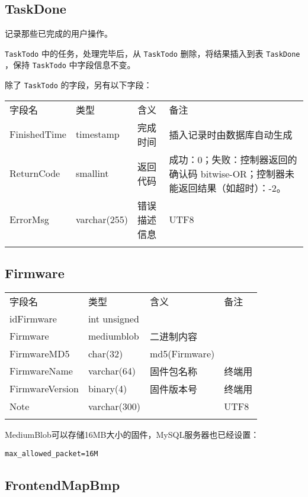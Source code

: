 \subsection{TaskDone}\label{taskdone}

记录那些已完成的用户操作。

\texttt{TaskTodo} 中的任务，处理完毕后，从 \texttt{TaskTodo}
删除，将结果插入到表 \texttt{TaskDone} ，保持 \texttt{TaskTodo}
中字段信息不变。

除了 \texttt{TaskTodo} 的字段，另有以下字段：

\begin{longtabu}[c]{@{}lXXX@{}}
\toprule\addlinespace
字段名 & 类型 & 含义 & 备注
\\\addlinespace
\midrule\endhead
FinishedTime & timestamp & 完成时间 & 插入记录时由数据库自动生成
\\\addlinespace
ReturnCode & smallint & 返回代码 & 成功：0；失败：控制器返回的确认码
bitwise-OR；控制器未能返回结果（如超时）：-2。
\\\addlinespace
ErrorMsg & varchar(255) & 错误描述信息 & UTF8
\\\addlinespace
\bottomrule
\end{longtabu}

\subsection{Firmware}\label{firmware}

\begin{longtabu}[c]{@{}lXXX@{}}
\toprule\addlinespace
字段名 & 类型 & 含义 & 备注
\\\addlinespace
\midrule\endhead
idFirmware & int unsigned & &
\\\addlinespace
Firmware & mediumblob & 二进制内容 &
\\\addlinespace
FirmwareMD5 & char(32) & md5(Firmware) &
\\\addlinespace
FirmwareName & varchar(64) & 固件包名称 & 终端用
\\\addlinespace
FirmwareVersion & binary(4) & 固件版本号 & 终端用
\\\addlinespace
Note & varchar(300) & & UTF8
\\\addlinespace
\bottomrule
\end{longtabu}

MediumBlob可以存储16MB大小的固件，MySQL服务器也已经设置：

\texttt{max\_allowed\_packet=16M}

\subsection{FrontendMapBmp}\label{frontendmapbmp}

